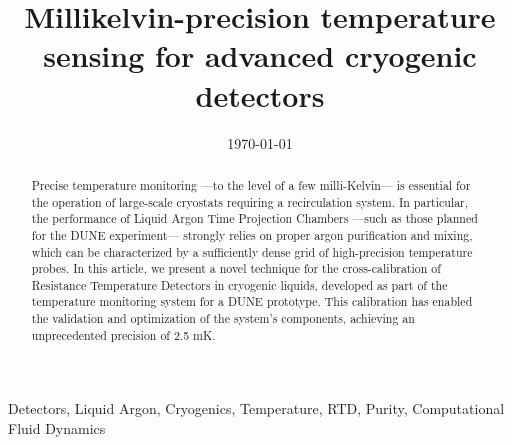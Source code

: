 \documentclass[review,1p,number,sort&compress]{elsarticle}
\begin{document}
\title{Millikelvin-precision temperature sensing for advanced cryogenic detectors}


\date{\today}

\begin{abstract}
Precise temperature monitoring  ---to the level of a few milli-Kelvin--- is essential for the operation of large-scale cryostats requiring a recirculation system. In particular, the performance of Liquid Argon Time Projection Chambers ---such as those planned for the DUNE experiment--- strongly relies on proper argon purification and mixing, which can be characterized by a sufficiently dense grid of high-precision temperature probes. In this article, we present a novel technique for the cross-calibration of Resistance Temperature Detectors in cryogenic liquids, developed as part of the temperature monitoring system for a DUNE prototype. This calibration has enabled the validation and optimization of the system’s components, achieving an unprecedented precision of 2.5 mK.

\end{abstract}

\begin{keyword}
Detectors, Liquid Argon, Cryogenics, Temperature, RTD, Purity, Computational Fluid Dynamics
\end{keyword}

\maketitle











\end{document}
